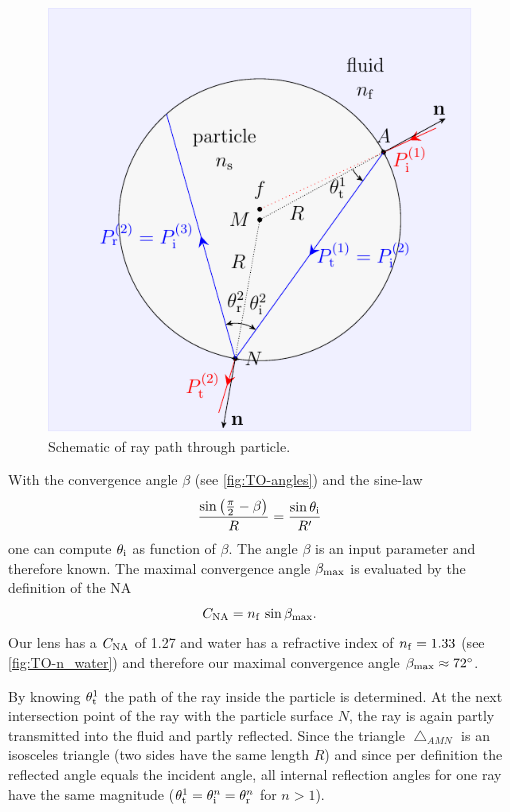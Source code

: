 \begin{figure}[thp]
  \centering
  \includegraphics[]{External/ray.pdf}
  \caption{Schematic of ray path through particle.}
  \label{fig:TO-ray_particle}
\end{figure}

With the convergence angle $\beta$ (see \cref{fig:TO-angles}) and the sine-law
\begin{equation}
  \frac{\sin\left( \frac{\pi}{2}-\beta \right)}{R} = 
  \frac{\sin\theta_{\mathrm{i}}}{R^{\prime}}
  \label{eq:TO-sine-law}
\end{equation}
one can compute $\theta_{\mathrm{i}}$ as function of $\beta$. The angle $\beta$ is an 
input parameter and therefore known. The maximal convergence angle 
$\beta_{\mathrm{max}}$ is evaluated by the definition of the NA
\begin{equation}
  C_{\mathrm{NA}} = n_{\mathrm{f}}\,\sin\beta_{\mathrm{max}}.
  \label{eq:TO-NA}
\end{equation}
Our lens has a $C_{\mathrm{NA}}$ of 1.27 and water has a refractive index of $n_{\mathrm{f}}=1.33$ 
(see \cref{fig:TO-n_water}) and therefore our maximal convergence angle 
$\beta_{\mathrm{max}} \approx \SI{72}{\degree}$.

By knowing $\theta_{\mathrm{t}}^{1}$ the path of the ray inside the particle is 
determined.  At the next intersection point of the ray with the particle 
surface $N$, the ray is again partly transmitted into the fluid and partly 
reflected. Since the triangle $\bigtriangleup_{AMN}$ is an isosceles triangle 
(two sides have the same length $R$) and since per definition the reflected 
angle equals the incident angle, all internal reflection angles for one ray 
have the same magnitude ($\theta_{\mathrm{t}}^{1}=\theta_{\mathrm{i}}^{n}=\theta_{\mathrm{r}}^{n}$ for 
$n>1$).

